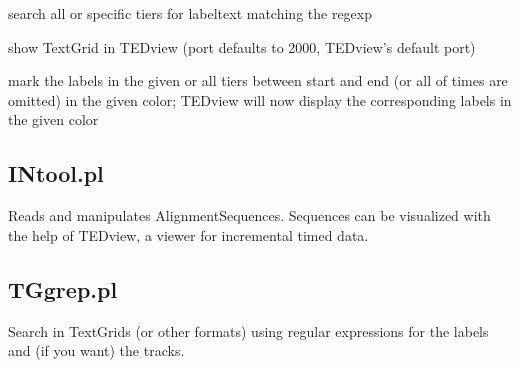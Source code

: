 \documentclass[a4,twoside=off,draft=true]{scrartcl}
\begin{document}
\begin{description}
        search all or specific tiers for labeltext matching the regexp
  \item[] %
  \item[TEDview \textlangle port\textrangle] 
        show TextGrid in TEDview (port defaults to 2000, TEDview's default port)
  \item[{mark [\textlangle tiername\textrangle] 
              [\textlangle start\textrangle \textlangle end\textrangle] 
              \textlangle color\textrangle}]
        mark the labels in the given or all tiers between start and end (or all of times are omitted)
        in the given color; TEDview will now display the corresponding labels in the given color
\end{description}

\subsection{INtool.pl}

Reads and manipulates AlignmentSequences. Sequences can be visualized with the help of
TEDview, a viewer for incremental timed data.

\subsection{TGgrep.pl}

Search in TextGrids (or other formats) using regular expressions for the labels and
(if you want) the tracks.
\end{document}
